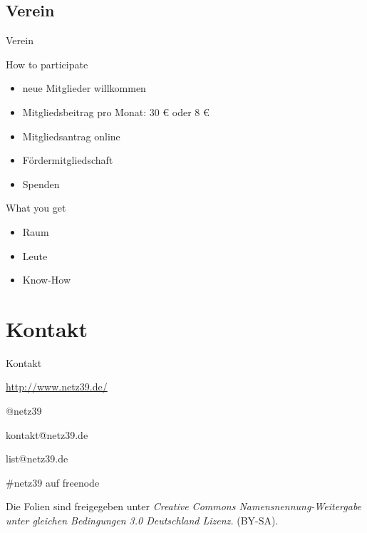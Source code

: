\documentclass[hyperref={pdfpagelabels=false}]{beamer}
\begin{document}
\subsection{Verein}

\begin{frame}{Verein}
    \begin{block}{How to participate}
        \begin{itemize}
            \item neue Mitglieder willkommen
            \item Mitgliedsbeitrag pro Monat: 30 € oder 8 €
            \item Mitgliedsantrag online
            \pause
            \item Fördermitgliedschaft
            \item Spenden
        \end{itemize}
    \end{block}
    \pause
    \begin{block}{What you get}
        \begin{itemize}
            \item Raum
            \item Leute
            \item Know-How
        \end{itemize}
    \end{block}
\end{frame}

\section{Kontakt}

\begin{frame}{Kontakt}
    \begin{description}
        \item[WWW] \url{http://www.netz39.de/}
        \item[Twitter/identi.ca] @netz39
        \item[E-Mail] kontakt@netz39.de
        \item[Mailingliste] list@netz39.de
        \item[IRC] \#netz39 auf freenode
    \end{description}

    \vspace{1em}
    \scriptsize
    Die Folien sind freigegeben unter \emph{Creative Commons
    Namensnennung-Weitergabe unter gleichen Bedingungen 3.0 Deutschland
    Lizenz.} (BY-SA).
    \normalsize
\end{frame}
\end{document}
